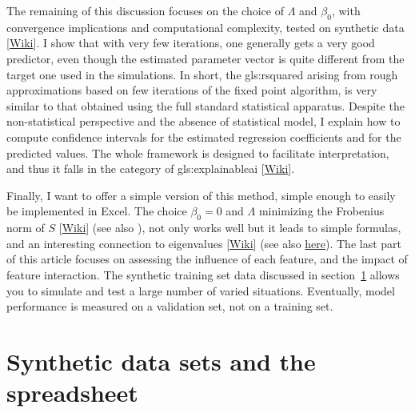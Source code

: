 \documentclass[oneside,10pt]{book}
\begin{document}
The remaining of this discussion focuses on the choice of $\Lambda$ and $\beta_0$, with convergence implications and computational complexity,
tested on \textcolor{index}{synthetic data} [\href{https://en.wikipedia.org/wiki/Synthetic_data}{Wiki}]. I show that with very few iterations, one generally gets a very good predictor, even though the estimated parameter vector is quite different from the target one used in the simulations. In short, the \gls{gls:rsquared} arising from rough approximations based on few iterations of the fixed point algorithm, is very similar to that obtained using the full standard statistical apparatus. Despite the non-statistical perspective and the absence of statistical model, I explain how to compute confidence intervals for the estimated regression coefficients and for the predicted values. The whole framework is designed to facilitate interpretation,
and thus it falls in the category of \gls{gls:explainableai} [\href{https://en.wikipedia.org/wiki/Explainable_artificial_intelligence}{Wiki}].

Finally, I want to offer a simple version of this method, simple enough to easily be implemented in Excel. The choice $\beta_0=0$ and $\Lambda$ minimizing the
\textcolor{index}{Frobenius norm} of $S$  [\href{https://en.wikipedia.org/wiki/Matrix_norm}{Wiki}] (see also \cite{numregxxx}), not only works well but it leads to simple formulas, and an interesting connection to \textcolor{index}{eigenvalues} [\href{https://en.wikipedia.org/wiki/Eigenvalues_and_eigenvectors}{Wiki}]
(see also \href{https://mathoverflow.net/questions/421309/power-of-a-matrix-largest-eigenvalue-in-absolute-value-and-convergence-acceler}{here}). The last part of this article focuses on assessing the influence of each feature, and the impact of feature interaction. The synthetic training set data discussed in section~\ref{sr001} allows you to simulate and test a large number of varied situations. Eventually, model performance is measured on a validation set, not on a training set.


\section{Synthetic data sets and the spreadsheet}\label{sr001}
\end{document}
